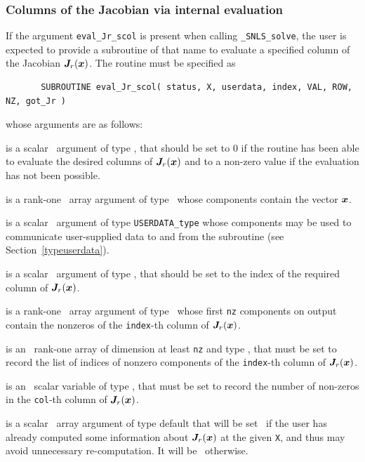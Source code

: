 \documentclass{galahad}
\newcommand{\packagename}{SNLS}
\newcommand{\fullpackagename}{\libraryname\_\packagename}
\newcommand{\solver}{{\tt \fullpackagename\_solve}}
\begin{document}

\subsubsection{Columns of the Jacobian via internal evaluation\label{jcol}}

If the argument {\tt eval\_Jr\_scol} is present when calling \solver, the
user is expected to provide a subroutine of that name to evaluate a specified 
column of the Jacobian ${\bm{J}}_r({\bm{x}})$. The routine must be specified as

\def\baselinestretch{0.8}
{\tt \begin{verbatim}
       SUBROUTINE eval_Jr_scol( status, X, userdata, index, VAL, ROW, NZ, got_Jr )
\end{verbatim} }
\def\baselinestretch{1.0}
\noindent whose arguments are as follows:

\begin{description}
 is a scalar \intentout\ argument of type \integer,
that should be set to 0 if the routine has been able to evaluate the desired 
columns of ${\bm{J}}_r({\bm{x}})$ and to a non-zero value if the evaluation has not 
been possible.

 is a rank-one \intentin\ array argument of type \realdp\
whose components contain the vector ${\bm{x}}$.

 is a scalar \intentinout\ argument of type
{\tt USERDATA\_type} whose components may be used
to communicate user-supplied data to and from the
subroutine (see Section~\ref{typeuserdata}).

 is a scalar \intentout\ argument of type \integer,
that should be set to the index of the required column of ${\bm{J}}_r({\bm{x}})$.

 is a rank-one \intentout\ array argument of type \realdp\
whose first {\tt nz} components on output contain the 
nonzeros of the {\tt index}-th column of ${\bm{J}}_r({\bm{x}})$.

 is an \intentinout\ rank-one array of dimension at least
{\tt nz} and type \integer, that must be set to record the list
of indices of nonzero components of the {\tt index}-th column of ${\bm{J}}_r({\bm{x}})$.

\itt{nz} is an \intentinout\ scalar variable of type \integer,
that must be set to record the number of non-zeros in the {\tt col}-th column
of ${\bm{J}}_r({\bm{x}})$.

 is a scalar \intentin\ array argument of type
default that will be set \true\ if the user has already computed
some information about ${\bm{J}}_r({\bm{x}})$ at the given {\tt X}, and thus
may avoid unnecessary re-computation. It will be \false\ otherwise.

\end{description}
\end{document}

